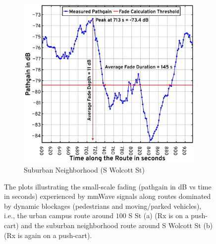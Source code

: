 \documentclass[12pt, draftcls, onecolumn]{IEEEtran}
\begin{document}
{\begin{figure} [t]
\begin{subfigure}{0.5\linewidth}
        \label{F10a}
    \end{subfigure}
    \begin{subfigure}{0.49\linewidth}
        \centering
        \includegraphics[width=1.0\linewidth]{figs/suburban_pathgain_vs_time_annotated.pdf}
        \caption{Suburban Neighborhood (S Wolcott St)}
        \label{F10b}
    \end{subfigure}
    \vspace{-8mm}
    \caption{The plots illustrating the small-scale fading (pathgain in dB vs time in seconds) experienced by mmWave signals along routes dominated by dynamic blockages (pedestrians and moving/parked vehicles), i.e., the urban campus route around $100$ S St (a) (Rx is on a push-cart) and the suburban neighborhood route around S Wolcott St (b) (Rx is again on a push-cart).}
    \label{F10}
\end{figure}

}
\end{document}
